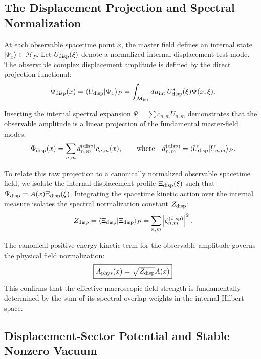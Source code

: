 \documentclass[11pt]{article}
\begin{document}
\subsection{The Displacement Projection and Spectral Normalization}
\label{sec:displacement_projection_operator}

At each observable spacetime point $x$, the master field defines an internal state $|\Psi_x\rangle \in \mathcal{H}_P$. Let $U_{\rm disp}(\xi)$ denote a normalized internal displacement test mode. The observable complex displacement amplitude is defined by the direct projection functional:
\begin{equation}
\Phi_{\rm disp}(x) = \langle U_{\rm disp} | \Psi_x \rangle_P = \int_{\mathcal{M}_{\rm int}} d\mu_{\rm int} \, U_{\rm disp}^*(\xi)\Psi(x, \xi).
\end{equation}

Inserting the internal spectral expansion $\Psi = \sum c_{n,m} U_{n,m}$ demonstrates that the observable amplitude is a linear projection of the fundamental master-field modes:
\begin{equation}
\Phi_{\rm disp}(x) = \sum_{n,m} d_{n,m}^{\rm (disp)} c_{n,m}(x), \qquad \text{where} \quad d_{n,m}^{\rm (disp)} = \langle U_{\rm disp} | U_{n,m} \rangle_P.
\end{equation}

To relate this raw projection to a canonically normalized observable spacetime field, we isolate the internal displacement profile $\Xi_{\rm disp}(\xi)$ such that $\Psi_{\rm disp} = A(x)\Xi_{\rm disp}(\xi)$. 
Integrating the spacetime kinetic action over the internal measure isolates the spectral normalization constant \cite{peskin1995introduction, Itzykson1980} $Z_{\rm disp}$:
\begin{equation}
Z_{\rm disp} = \langle \Xi_{\rm disp} | \Xi_{\rm disp} \rangle_P = \sum_{n,m} \left| \zeta_{n,m}^{\rm (disp)} \right|^2.
\end{equation}

The canonical positive-energy kinetic term for the observable amplitude governs the physical field normalization:
\begin{equation}
\boxed{ A_{\rm phys}(x) = \sqrt{Z_{\rm disp}} A(x) }
\end{equation}
This confirms that the effective macroscopic field strength is fundamentally determined by the sum of its spectral overlap weights in the internal Hilbert space.

\subsection{Displacement-Sector Potential and Stable Nonzero Vacuum}
\label{sec:displacement_lagrangian_and_vacuum}
\label{sec:higgs_lagrangian_and_vacuum}
\end{document}
